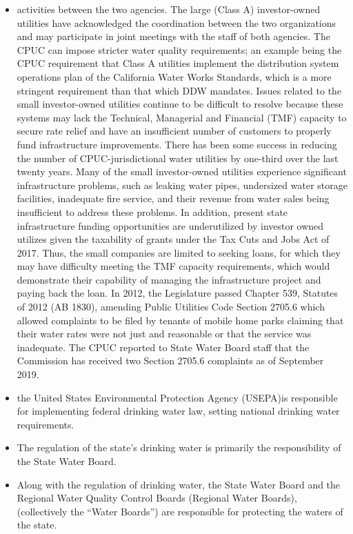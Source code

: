 \begin{itemize}
\item activities between the two agencies. The large (Class A) investor-owned utilities have acknowledged the coordination between the two organizations and may participate in joint meetings with the staff of both agencies. The CPUC can impose stricter water quality requirements; an example being the CPUC requirement that Class A utilities implement the distribution system operations plan of the California Water Works Standards, which is a more stringent requirement than that which DDW mandates.
Issues related to the small investor-owned utilities continue to be difficult to resolve because these systems may lack the Technical, Managerial and Financial (TMF) capacity to secure rate relief and have an insufficient number of customers to properly fund infrastructure improvements. There has been some success in reducing the number of CPUC-jurisdictional water utilities by one-third over the last twenty years. Many of the  small investor-owned utilities experience significant infrastructure problems, such as leaking water pipes, undersized water storage facilities, inadequate fire service, and their revenue from water sales being insufficient to address these problems. In addition, present state infrastructure funding opportunities are underutilized by investor owned utilizes given the taxability of grants under the Tax Cuts and Jobs Act of 2017. Thus, the small companies are limited to seeking loans, for which they may have difficulty meeting the TMF capacity requirements, which would demonstrate their capability of managing the infrastructure project and paying back the loan.
In 2012, the Legislature passed Chapter 539, Statutes of 2012 (AB 1830), amending Public Utilities Code Section 2705.6 which allowed complaints to be filed by tenants of mobile home parks claiming that their water rates were not just and reasonable or that the service was inadequate. The CPUC reported to State Water Board staff that the Commission has received two Section 2705.6 complaints as of September 2019.
\item the United States Environmental Protection Agency (USEPA)is responsible for implementing federal drinking water law, setting national drinking water requirements.

\item The regulation of the state’s drinking water is primarily the responsibility of the State Water Board. 

\item Along with the regulation of drinking water, the State Water Board and the Regional Water Quality Control Boards (Regional Water Boards), (collectively the “Water Boards”) are responsible for protecting the waters of the state.


\end{itemize}
